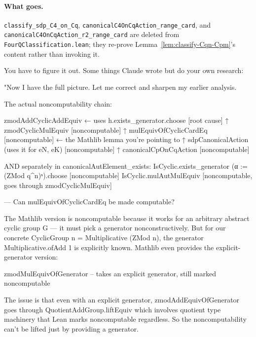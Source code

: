 \paragraph{What goes.} \texttt{classify\_sdp\_C4\_on\_Cq},
\texttt{canonicalC4OnCqAction\_range\_card}, and
\texttt{canonicalC4OnCqAction\_r2\_range\_card} are deleted from
\texttt{FourQClassification.lean}; they re-prove
Lemma~\ref{lem:classify-Cqn-Cpm}'s content rather than invoking it.









You have to figure it out. Some things Claude wrote but do your own research:

"Now I have the full picture. Let me correct and sharpen my earlier analysis.

  The actual noncomputability chain:

  zmodAddCyclicAddEquiv  ← uses h.exists_generator.choose  [root cause]
    ↑
  zmodCyclicMulEquiv     [noncomputable]
    ↑
  mulEquivOfCyclicCardEq [noncomputable]  ← the Mathlib lemma you're pointing to
    ↑
  sdpCanonicalAction     (uses it for eN, eK)  [noncomputable]
    ↑
  canonicalCpOnCqAction  [noncomputable]

  AND separately in canonicalAutElement_exists:
  IsCyclic.exists_generator (α := (ZMod q^n)ˣ).choose  [noncomputable]
  IsCyclic.mulAutMulEquiv                                [noncomputable, goes through zmodCyclicMulEquiv]

  ---
  Can mulEquivOfCyclicCardEq be made computable?
  
  The Mathlib version is noncomputable because it works for an arbitrary abstract cyclic group G — it must pick a generator nonconstructively. But for our concrete CyclicGroup n = Multiplicative (ZMod n),
  the generator Multiplicative.ofAdd 1 is explicitly known. Mathlib even provides the explicit-generator version:

  zmodMulEquivOfGenerator  -- takes an explicit generator, still marked noncomputable

  The issue is that even with an explicit generator, zmodAddEquivOfGenerator goes through QuotientAddGroup.liftEquiv which involves quotient type machinery that Lean marks noncomputable regardless. So the
  noncomputability can't be lifted just by providing a generator.

